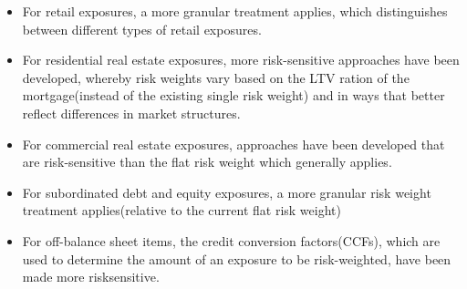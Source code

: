 \begin{itemize}
\item For retail exposures, a more granular treatment applies, which distinguishes between different types of retail exposures.
\item For residential real estate exposures, more risk-sensitive approaches have been developed, whereby risk weights vary based on the LTV ration of the mortgage(instead of the existing single risk weight) and in ways that better reflect differences in market structures.
\item For commercial real estate exposures, approaches have been developed that are risk-sensitive than the flat risk weight which generally applies.
\item For subordinated debt and equity exposures, a more granular risk weight treatment applies(relative to the current flat risk weight)
\item For off-balance sheet items, the credit conversion factors(CCFs), which are used to determine the amount of an exposure to be risk-weighted, have been made more risksensitive.
\end{itemize}



